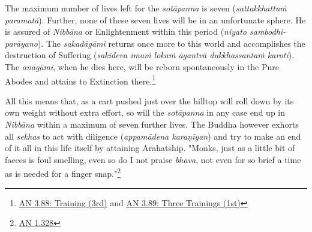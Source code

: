 The maximum number of lives left for the \emph{sotāpanna} is seven (\emph{sattakkhattuṁ paramatā}). Further, none of these seven lives will be in an unfortunate sphere. He is assured of \emph{Nibbāna} or Enlightenment within this period (\emph{niyato sambodhi-parāyano}). The \emph{sakadāgāmi} returns once more to this world and accomplishes the destruction of Suffering (\emph{sakideva imaṁ lokaṁ āgantvā dukkhassantaṁ karoti}). The \emph{anāgāmi}, when he dies here, will be reborn spontaneously in the Pure Abodes and attains to Extinction there.\footnote{\href{https://suttacentral.net/an3.88/en/sujato}{AN 3.88: Training (3rd)} and \href{https://suttacentral.net/an3.89/en/sujato}{AN 3.89: Three Trainings (1st)}}

All this means that, as a cart pushed just over the hilltop will roll down by its own weight without extra effort, so will the \emph{sotāpanna} in any case end up in \emph{Nibbāna} within a maximum of seven further lives. The Buddha however exhorts all \emph{sekhas} to act with diligence (\emph{appamādena karaṇīyan}) and try to make an end of it all in this life itself by attaining Arahatship. "Monks, just as a little bit of faeces is foul smelling, even so do I not praise \emph{bhava}, not even for so brief a time as is needed for a finger snap."\footnote{\href{https://suttacentral.net/an1.316-332/en/sujato}{AN 1.328}}
